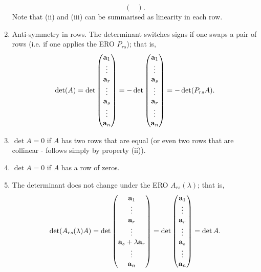 \documentclass[10pt, a4paper]{article}
\begin{document}
\begin{proposition}
\begin{enumerate}[label = (\roman*)]
\[\begin{pmatrix}
        \end{pmatrix}.
        \]
        Note that (ii) and (iii) can be summarised as linearity in each row.
        \item Anti-symmetry in rows.
        The determinant switches signs if one swaps a pair of rows (i.e. if one applies the ERO $P_{rs}$);
        that is,
        \[
        \det(A) = \det\begin{pmatrix}
            \mathbf{a}_1 \\ \vdots \\ \mathbf{a}_r \\ \vdots \\ \mathbf{a}_s \\ \vdots \\ \mathbf{a}_n
        \end{pmatrix}
        = -\det\begin{pmatrix}
            \mathbf{a}_1 \\ \vdots \\ \mathbf{a}_s \\ \vdots \\ \mathbf{a}_r \\ \vdots \\ \mathbf{a}_n
        \end{pmatrix}
        =
        -\det(P_{rs}A).
        \]
        \item $\det A = 0$ if $A$ has two rows that are equal
        (or even two rows that are collinear - follows simply by property (ii)).
        \item $\det A = 0$ if $A$ has a row of zeros.
        \item The determinant does not change under the ERO $A_{rs}(\lambda)$; that is,
        \[
        \det(A_{rs}(\lambda)A) = \det\begin{pmatrix}
            \mathbf{a}_1 \\ \vdots \\ \mathbf{a}_r \\ \vdots \\ \mathbf{a}_s + \lambda\mathbf{a}_r \\ \vdots \\ \mathbf{a}_n
        \end{pmatrix}
        =
        \det\begin{pmatrix}
            \mathbf{a}_1 \\ \vdots \\ \mathbf{a}_r \\ \vdots \\ \mathbf{a}_s \\ \vdots \\ \mathbf{a}_n
        \end{pmatrix}
        = \det A.
        \]
        \end{enumerate}
\end{proposition}
\end{document}
